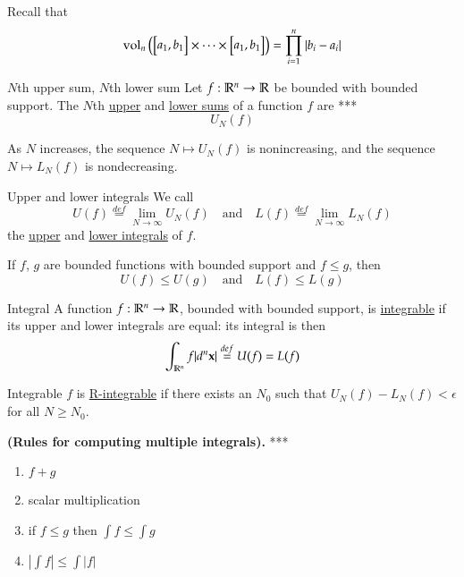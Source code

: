 Recall that
\begin{equation}
	\text{vol}_n \left( \begin{bmatrix} a_1, b_1 \end{bmatrix} \times \cdots \times \begin{bmatrix} a_1, b_1 \end{bmatrix} \right)=\prod_{i=1}^n |b_i-a_i|
\end{equation}

\begin{defn}{$N$th upper sum, $N$th lower sum} 
	Let $f: \mathbb{R}^n \to \mathbb{R}$ be bounded with bounded support. The $N$th \ul{upper} and \ul{lower sums} of a function $f$ are ***
	\begin{equation}
		U_N(f) 
	\end{equation}
\end{defn}

\begin{proposition}
	As $N$ increases, the sequence $N\mapsto U_N(f)$ is nonincreasing, and the sequence $N\mapsto L_N(f)$ is nondecreasing. 
\end{proposition}

\begin{defn}{Upper and lower integrals}
	We call
	\begin{equation}
		U(f)\overset{def}{=} \lim_{N\to \infty} U_N(f) \quad \text{and}\quad L(f)\overset{def}{=} \lim_{N\to \infty} L_N(f)
	\end{equation}
	the \ul{upper} and \ul{lower integrals} of $f$. 
\end{defn}

\begin{proposition}
	If $f$, $g$ are bounded functions with bounded support and $f\leq g$, then
	\begin{equation}
		U(f)\leq U(g) \quad \text{and} \quad L(f)\leq L(g)
	\end{equation}
\end{proposition}

\begin{defn}{Integral}
	A function $f : \mathbb{R}^n \to \mathbb{R}$, bounded with bounded support, is \ul{integrable} if its upper and lower integrals are equal: its integral is then
	\begin{equation}
		\int_{\mathbb{R}^n} f|d^n\textbf{x}| \overset{def}{=} U(f) = L(f)
	\end{equation}
\end{defn}

\begin{defn}{Integrable}
	$f$ is \ul{R-integrable} if there exists an $N_0$ such that $U_N(f) - L_N(f) < \epsilon$ for all $N\geq N_0$. 
\end{defn}

\begin{proposition}\textbf{(Rules for computing multiple integrals).} ***

\begin{enumerate}
	\item $f+g$
	\item scalar multiplication
	\item if $f\leq g$ then $\int f \leq \int g$
	\item $\left|\int f\right|\leq \int |f|$
\end{enumerate}
\end{proposition}

